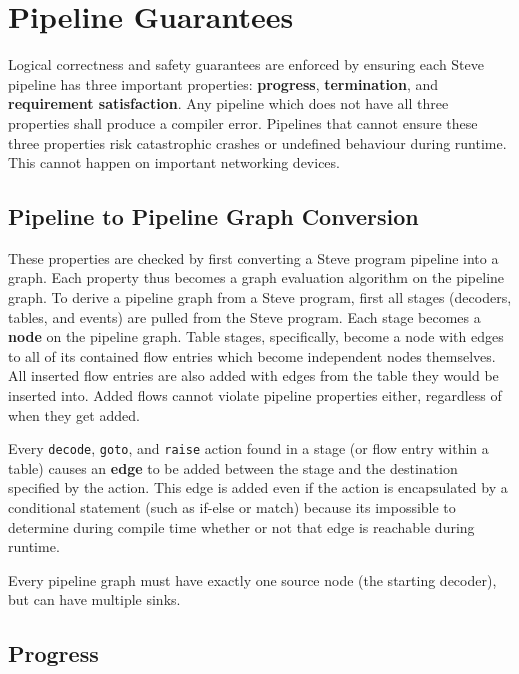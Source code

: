 \section{Pipeline Guarantees} \label{pipeline_checking_guide}

Logical correctness and safety guarantees are enforced by ensuring each Steve pipeline has three important properties: \textbf{progress}, \textbf{termination}, and \textbf{requirement satisfaction}. Any pipeline which does not have all three properties shall produce a compiler error. Pipelines that cannot ensure these three properties risk catastrophic crashes or undefined behaviour during runtime. This cannot happen on important networking devices.

\subsection{Pipeline to Pipeline Graph Conversion} \label{pipeline_graph}

These properties are checked by first converting a Steve program pipeline into a graph. Each property thus becomes a graph evaluation algorithm on the pipeline graph. To derive a pipeline graph from a Steve program, first all stages (decoders, tables, and events) are pulled from the Steve program. Each stage becomes a \textbf{node} on the pipeline graph. Table stages, specifically, become a node with edges to all of its contained flow entries which become independent nodes themselves. All inserted flow entries are also added with edges from the table they would be inserted into. Added flows cannot violate pipeline properties either, regardless of when they get added.

Every \texttt{decode}, \texttt{goto}, and \texttt{raise} action found in a stage (or flow entry within a table) causes an \textbf{edge} to be added between the stage and the destination specified by the action. This edge is added even if the action is encapsulated by a conditional statement (such as if-else or match) because its impossible to determine during compile time whether or not that edge is reachable during runtime.

Every pipeline graph must have exactly one source node (the starting decoder), but can have multiple sinks.

\subsection{Progress} \label{progress_guide}

